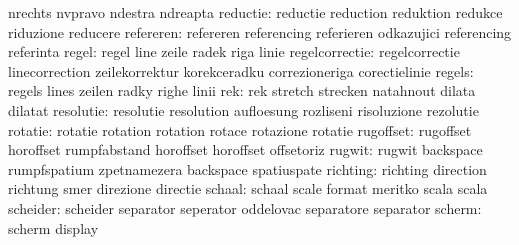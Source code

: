                            nrechts                   nvpravo
                           ndestra                   ndreapta
                 reductie: reductie                  reduction
                           reduktion                 redukce
                           riduzione                 reducere
                refereren: refereren                 referencing
                           referieren                odkazujici
                           referencing               referinta %
                    regel: regel                     line
                           zeile                     radek
                           riga                      linie
           regelcorrectie: regelcorrectie            linecorrection
                           zeilekorrektur            korekceradku
                           correzioneriga            corectielinie
                   regels: regels                    lines
                           zeilen                    radky
                           righe                     linii
                      rek: rek                       stretch
                           strecken                  natahnout
                           dilata                    dilatat %
                resolutie: resolutie                 resolution
                           aufloesung                rozliseni
                           risoluzione               rezolutie
                  rotatie: rotatie                   rotation
                           rotation                  rotace
                           rotazione                 rotatie
                rugoffset: rugoffset                 horoffset
                           rumpfabstand              horoffset
                           horoffset                 offsetoriz %
                   rugwit: rugwit                    backspace
                           rumpfspatium              zpetnamezera
                           backspace                 spatiuspate %
                 richting: richting                  direction
                           richtung                  smer
                           direzione                 directie
                   schaal: schaal                    scale
                           format                    meritko
                           scala                     scala
                 scheider: scheider                  separator
                           seperator                 oddelovac
                           separatore                separator
                   scherm: scherm                    display
